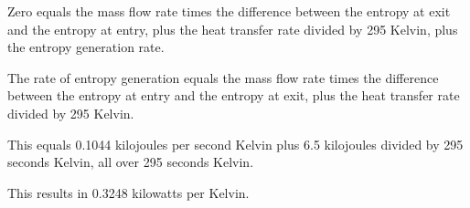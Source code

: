 Zero equals the mass flow rate times the difference between the entropy at exit and the entropy at entry, plus the heat transfer rate divided by 295 Kelvin, plus the entropy generation rate.

The rate of entropy generation equals the mass flow rate times the difference between the entropy at entry and the entropy at exit, plus the heat transfer rate divided by 295 Kelvin.

This equals 0.1044 kilojoules per second Kelvin plus 6.5 kilojoules divided by 295 seconds Kelvin, all over 295 seconds Kelvin.

This results in 0.3248 kilowatts per Kelvin.